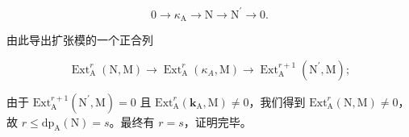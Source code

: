 \[
0 \rightarrow \kappa_ {\mathrm{A}} \longrightarrow \mathrm{N} \longrightarrow \mathrm{N} ^ {\prime} \rightarrow 0.
\]

由此导出扩张模的一个正合列

\[
\operatorname{Ext} _ {\mathrm{A}} ^ {r} (\mathrm{N}, \mathrm{M}) \longrightarrow \operatorname{Ext} _ {\mathrm{A}} ^ {r} (\kappa_ {A}, \mathrm{M}) \longrightarrow \operatorname{Ext} _ {\mathrm{A}} ^ {r + 1} (\mathrm{N} ^ {\prime}, \mathrm{M});
\]

由于 \(\mathrm{Ext}_{\mathrm{A}}^{r + 1}(\mathrm{N}^{\prime},\mathrm{M}) = 0\) 且 \(\mathrm{Ext}_{\mathrm{A}}^{r}(\mathbf{k}_{\mathrm{A}},\mathrm{M})\neq 0\)，我们得到 \(\mathrm{Ext}_{\mathrm{A}}^{r}(\mathrm{N},\mathrm{M})\neq 0\)，故 \(r\leqslant \mathrm{dp}_{\mathrm{A}}(\mathrm{N}) = s\)。最终有 \(r = s\)，证明完毕。
